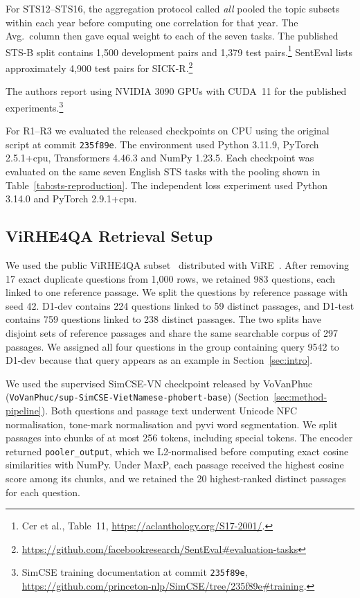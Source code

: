 For STS12--STS16, the aggregation protocol called \emph{all} pooled the
topic subsets within each year before computing one correlation for that
year. The Avg.\ column then gave equal weight to each of the seven tasks.
The published STS-B split contains 1,500 development pairs and 1,379
test pairs.\footnote{Cer et al., Table~11,
\url{https://aclanthology.org/S17-2001/}.} SentEval lists approximately
4,900 test pairs for SICK-R.\footnote{\url{https://github.com/facebookresearch/SentEval#evaluation-tasks}}

The authors report using NVIDIA 3090 GPUs with CUDA~11 for the published
experiments.\footnote{SimCSE training documentation at commit
\texttt{235f89e}, \url{https://github.com/princeton-nlp/SimCSE/tree/235f89e#training}.}

For R1--R3 we evaluated the released checkpoints on CPU using the original
script at commit \texttt{235f89e}. The environment used Python 3.11.9,
PyTorch 2.5.1+cpu, Transformers 4.46.3 and NumPy 1.23.5. Each checkpoint
was evaluated on the same seven English STS tasks with the pooling shown in
Table~\ref{tab:sts-reproduction}.
The independent loss experiment used Python 3.14.0 and PyTorch 2.9.1+cpu.

\subsection{ViRHE4QA Retrieval Setup}
\label{sec:d1-setup}
We used the public ViRHE4QA subset~\cite{do2024r2gqaretrieverreadergeneratorquestionanswering}
distributed with ViRE~\cite{nguyen-quan-2026-works}.
After removing 17 exact duplicate questions from 1,000 rows, we retained
983 questions, each linked to one reference passage. We split the questions
by reference passage with seed 42. D1-dev contains 224 questions linked to
59 distinct passages, and D1-test contains 759 questions linked to 238
distinct passages. The two splits have disjoint sets of reference passages
and share the same searchable corpus of 297 passages. We assigned all four
questions in the group containing query 9542 to D1-dev because that query
appears as an example in Section~\ref{sec:intro}.

We used the supervised SimCSE-VN checkpoint released by VoVanPhuc
(\texttt{VoVanPhuc/sup-SimCSE-}\allowbreak\texttt{VietNamese-phobert-base})
(Section~\ref{sec:method-pipeline}). Both questions and passage text underwent
Unicode NFC normalisation, tone-mark normalisation and pyvi word segmentation.
We split passages into chunks of at most 256 tokens, including special
tokens. The encoder returned \texttt{pooler\_output}, which we L2-normalised
before computing exact cosine similarities with NumPy. Under MaxP, each
passage received the highest cosine score among its chunks, and we retained
the 20 highest-ranked distinct passages for each question.

